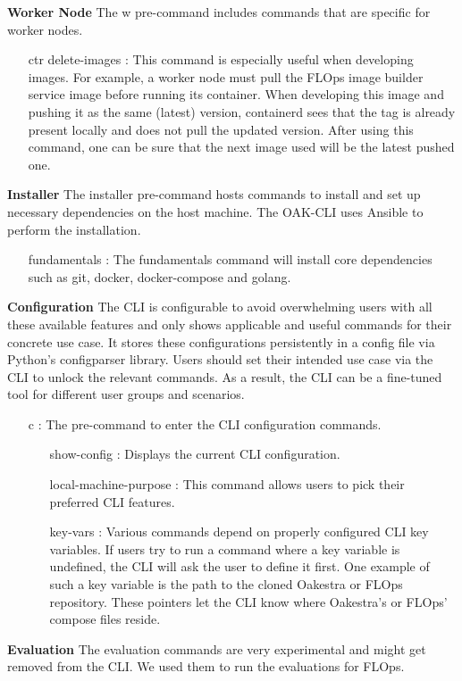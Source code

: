 \vspace{5mm}
\textbf{Worker Node}\newline
The w pre-command includes commands that are specific for worker nodes.
\begin{itemize}
    \item [ctr delete-images]:
        This command is especially useful when developing images.
        For example, a worker node must pull the FLOps image builder service image before running its container.
        When developing this image and pushing it as the same (latest) version, containerd sees that the tag is already present locally and does not pull the updated version.
        After using this command, one can be sure that the next image used will be the latest pushed one.
\end{itemize}
\vspace{5mm}
\textbf{Installer}\newline
The installer pre-command hosts commands to install and set up necessary dependencies on the host machine.
The OAK-CLI uses Ansible to perform the installation.
\begin{itemize}
    \item [fundamentals]:
        The fundamentals command will install core dependencies such as git, docker, docker-compose and golang.
\end{itemize}
\vspace{5mm}
\textbf{Configuration}\newline
The CLI is configurable to avoid overwhelming users with all these available features and only shows applicable and useful commands for their concrete use case.
It stores these configurations persistently in a config file via Python's configparser library.
Users should set their intended use case via the CLI to unlock the relevant commands.
As a result, the CLI can be a fine-tuned tool for different user groups and scenarios.
\begin{itemize}
    \item [c]:
        The pre-command to enter the CLI configuration commands.
        \begin{itemize}
            \item [show-config]:
                Displays the current CLI configuration.
            \item [local-machine-purpose]:
                This command allows users to pick their preferred CLI features.
            \item [key-vars]:
                Various commands depend on properly configured CLI key variables.
                If users try to run a command where a key variable is undefined, the CLI will ask the user to define it first.
                One example of such a key variable is the path to the cloned Oakestra or FLOps repository.
                These pointers let the CLI know where Oakestra's or FLOps' compose files reside.
        \end{itemize}
\end{itemize}
\vspace{5mm}
\textbf{Evaluation}\newline
The evaluation commands are very experimental and might get removed from the CLI.
We used them to run the evaluations for FLOps.

